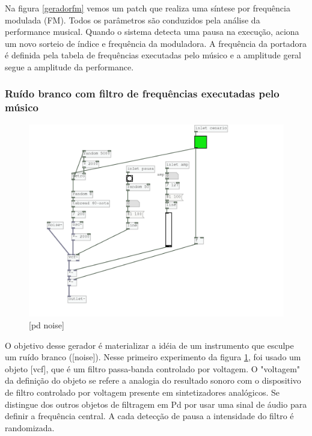 \documentclass[draft]{ppgmus}
\begin{document}
Na figura \ref{geradorfm} vemos um patch que realiza 
uma síntese por frequência modulada (FM). Todos os parâmetros
são conduzidos pela análise da performance musical.
Quando o sistema detecta uma pausa na execução, aciona um novo
sorteio de índice e frequência da moduladora.
A frequência da portadora é definida pela tabela de frequências
executadas pelo músico e a amplitude geral segue a amplitude
da performance.


\subsubsection{Ruído branco com filtro de frequências executadas pelo músico}

\begin{figure}
\includegraphics[scale=.6]{gerador-sintese-noise}
\caption{[pd noise]}
\label{geradornoise}
\end{figure}

O objetivo desse gerador é materializar a idéia de um
instrumento que esculpe um ruído branco ([noise\texttildelow]).
Nesse primeiro experimento da figura \ref{geradornoise}, foi usado 
um objeto [vcf\texttildelow], que é um filtro passa-banda controlado
por voltagem. O "voltagem" da definição do objeto se refere a analogia
do resultado sonoro com  o dispositivo de filtro controlado por voltagem
presente em sintetizadores analógicos. Se distingue dos outros objetos
de filtragem em Pd por usar uma sinal de áudio para definir a frequência
central. A cada detecção de pausa a intensidade do filtro é randomizada.
\end{document}
